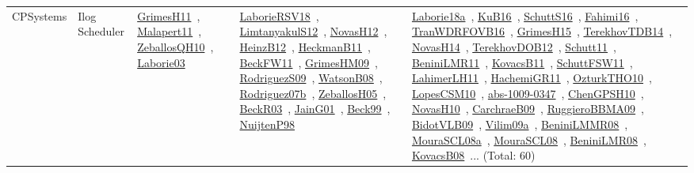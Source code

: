 {\begin{longtable}{lp{3cm}>{\raggedright\arraybackslash}p{6cm}>{\raggedright\arraybackslash}p{6cm}>{\raggedright\arraybackslash}p{8cm}}
CPSystems & Ilog Scheduler & \href{../works/GrimesH11.pdf}{GrimesH11}~\cite{GrimesH11}, \href{../works/Malapert11.pdf}{Malapert11}~\cite{Malapert11}, \href{../works/ZeballosQH10.pdf}{ZeballosQH10}~\cite{ZeballosQH10}, \href{../works/Laborie03.pdf}{Laborie03}~\cite{Laborie03} & \href{../works/LaborieRSV18.pdf}{LaborieRSV18}~\cite{LaborieRSV18}, \href{../works/LimtanyakulS12.pdf}{LimtanyakulS12}~\cite{LimtanyakulS12}, \href{../works/NovasH12.pdf}{NovasH12}~\cite{NovasH12}, \href{../works/HeinzB12.pdf}{HeinzB12}~\cite{HeinzB12}, \href{../works/HeckmanB11.pdf}{HeckmanB11}~\cite{HeckmanB11}, \href{../works/BeckFW11.pdf}{BeckFW11}~\cite{BeckFW11}, \href{../works/GrimesHM09.pdf}{GrimesHM09}~\cite{GrimesHM09}, \href{../works/RodriguezS09.pdf}{RodriguezS09}~\cite{RodriguezS09}, \href{../works/WatsonB08.pdf}{WatsonB08}~\cite{WatsonB08}, \href{../works/Rodriguez07b.pdf}{Rodriguez07b}~\cite{Rodriguez07b}, \href{../works/ZeballosH05.pdf}{ZeballosH05}~\cite{ZeballosH05}, \href{../works/BeckR03.pdf}{BeckR03}~\cite{BeckR03}, \href{../works/JainG01.pdf}{JainG01}~\cite{JainG01}, \href{../works/Beck99.pdf}{Beck99}~\cite{Beck99}, \href{../works/NuijtenP98.pdf}{NuijtenP98}~\cite{NuijtenP98} & \href{../works/Laborie18a.pdf}{Laborie18a}~\cite{Laborie18a}, \href{../works/KuB16.pdf}{KuB16}~\cite{KuB16}, \href{../works/SchuttS16.pdf}{SchuttS16}~\cite{SchuttS16}, \href{../works/Fahimi16.pdf}{Fahimi16}~\cite{Fahimi16}, \href{../works/TranWDRFOVB16.pdf}{TranWDRFOVB16}~\cite{TranWDRFOVB16}, \href{../works/GrimesH15.pdf}{GrimesH15}~\cite{GrimesH15}, \href{../works/TerekhovTDB14.pdf}{TerekhovTDB14}~\cite{TerekhovTDB14}, \href{../works/NovasH14.pdf}{NovasH14}~\cite{NovasH14}, \href{../works/TerekhovDOB12.pdf}{TerekhovDOB12}~\cite{TerekhovDOB12}, \href{../works/Schutt11.pdf}{Schutt11}~\cite{Schutt11}, \href{../works/BeniniLMR11.pdf}{BeniniLMR11}~\cite{BeniniLMR11}, \href{../works/KovacsB11.pdf}{KovacsB11}~\cite{KovacsB11}, \href{../works/SchuttFSW11.pdf}{SchuttFSW11}~\cite{SchuttFSW11}, \href{../works/LahimerLH11.pdf}{LahimerLH11}~\cite{LahimerLH11}, \href{../works/HachemiGR11.pdf}{HachemiGR11}~\cite{HachemiGR11}, \href{../works/OzturkTHO10.pdf}{OzturkTHO10}~\cite{OzturkTHO10}, \href{../works/LopesCSM10.pdf}{LopesCSM10}~\cite{LopesCSM10}, \href{../works/abs-1009-0347.pdf}{abs-1009-0347}~\cite{abs-1009-0347}, \href{../works/ChenGPSH10.pdf}{ChenGPSH10}~\cite{ChenGPSH10}, \href{../works/NovasH10.pdf}{NovasH10}~\cite{NovasH10}, \href{../works/CarchraeB09.pdf}{CarchraeB09}~\cite{CarchraeB09}, \href{../works/RuggieroBBMA09.pdf}{RuggieroBBMA09}~\cite{RuggieroBBMA09}, \href{../works/BidotVLB09.pdf}{BidotVLB09}~\cite{BidotVLB09}, \href{../works/Vilim09a.pdf}{Vilim09a}~\cite{Vilim09a}, \href{../works/BeniniLMMR08.pdf}{BeniniLMMR08}~\cite{BeniniLMMR08}, \href{../works/MouraSCL08a.pdf}{MouraSCL08a}~\cite{MouraSCL08a}, \href{../works/MouraSCL08.pdf}{MouraSCL08}~\cite{MouraSCL08}, \href{../works/BeniniLMR08.pdf}{BeniniLMR08}~\cite{BeniniLMR08}, \href{../works/KovacsB08.pdf}{KovacsB08}~\cite{KovacsB08}... (Total: 60)\\

\end{longtable}}
